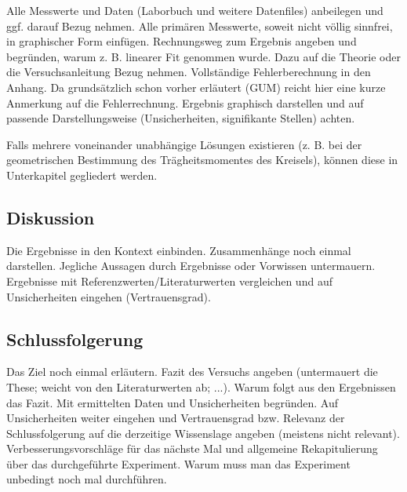 Alle Messwerte und Daten (Laborbuch und weitere Datenfiles) anbeilegen und ggf. darauf Bezug nehmen.
Alle primären Messwerte, soweit nicht völlig sinnfrei, in graphischer Form einfügen.
Rechnungsweg zum Ergebnis angeben und begründen, warum z. B. linearer Fit genommen wurde.
Dazu auf die Theorie oder die Versuchsanleitung Bezug nehmen.
Vollständige Fehlerberechnung in den Anhang.
Da grundsätzlich schon vorher erläutert (GUM) reicht hier eine kurze Anmerkung auf die Fehlerrechnung.
Ergebnis graphisch darstellen und auf passende Darstellungsweise (Unsicherheiten, signifikante Stellen) achten.

Falls mehrere voneinander unabhängige Lösungen existieren (z. B. bei der geometrischen Bestimmung des Trägheitsmomentes des Kreisels), können diese in Unterkapitel gegliedert werden.

\subsection{Diskussion}

Die Ergebnisse in den Kontext einbinden.
Zusammenhänge noch einmal darstellen.
Jegliche Aussagen durch Ergebnisse oder Vorwissen untermauern.
Ergebnisse mit Referenzwerten/Literaturwerten vergleichen und auf Unsicherheiten eingehen (Vertrauensgrad).

\subsection{Schlussfolgerung}

Das Ziel noch einmal erläutern.
Fazit des Versuchs angeben (untermauert die These; weicht von den Literaturwerten ab; ...).
Warum folgt aus den Ergebnissen das Fazit.
Mit ermittelten Daten und Unsicherheiten begründen.
Auf Unsicherheiten weiter eingehen und Vertrauensgrad bzw. Relevanz der Schlussfolgerung auf die derzeitige Wissenslage angeben (meistens nicht relevant).
Verbesserungsvorschläge für das nächste Mal und allgemeine Rekapitulierung über das durchgeführte Experiment.
Warum muss man das Experiment unbedingt noch mal durchführen.
